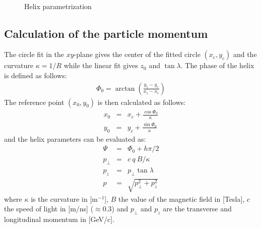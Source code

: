 \documentclass[twoside]{article}
\begin{document}
\begin{description}
\begin{figure}[thb]
\mbox{
  \quad
  }
  \caption{Helix parametrization}
  \label{fig:helix}
\end{figure}

\subsection{Calculation of the particle momentum}

The circle fit in the $xy$-plane gives the center of the fitted circle $(x_c, y_c)$
and the curvature $\kappa = 1/R$ while the linear fit gives $z_0$ and $\tan \lambda$.
The phase of the helix is defined as follows:
\begin{eqnarray}
  \Phi_0 = \arctan \left( \frac{y_1 - y_c}{x_1 - x_c} \right)
\end{eqnarray}
The reference point $(x_0, y_0)$ is then calculated as follows:
\begin{eqnarray}
  x_0 & = & x_c + \frac{\cos \Phi_0}{\kappa} \\
  y_0 & = & y_c + \frac{\sin \Phi_0}{\kappa}
\end{eqnarray}
and the helix parameters can be evaluated as:
\begin{eqnarray}
  \Psi & = & \Phi_0 + h \pi / 2 \\
  p_\perp & = & c\ q\ B / \kappa \\
  p_z & = & p_\perp \tan \lambda \\
  p & = & \sqrt{p^2_\perp + p^2_z}
\end{eqnarray}
where $\kappa$ is the curvature in [m$^{-1}$], $B$ the value of the
magnetic field in [Tesla], $c$ the speed of light in [m/ns] ($\approx
0.3$) and $p_\perp$ and $p_z$ are the transverse and longitudinal
momentum in [GeV/c].


\end{description}
\end{document}
